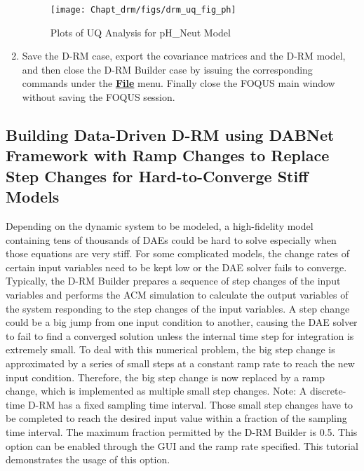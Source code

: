\begin{enumerate}
	\begin{figure}[H]
		\begin{center}
			\texttt{[image: Chapt\_drm/figs/drm\_uq\_fig\_ph]}
			\caption{Plots of UQ Analysis for pH\_Neut Model}
			\label{fig.drm_uq_fig_ph}
		\end{center}
	\end{figure}
	\item Save the D-RM case, export the covariance matrices and the D-RM model, and then close the D-RM Builder case by issuing the corresponding commands under the \textbf{\underline{File}} menu.  Finally close the FOQUS main window without saving the FOQUS session.
\end{enumerate}

\subsection{Building Data-Driven D-RM using DABNet Framework with Ramp Changes to Replace Step Changes for Hard-to-Converge Stiff Models}
Depending on the dynamic system to be modeled, a high-fidelity model containing tens of thousands of DAEs could be hard to solve especially when those equations are very stiff.  For some complicated models, the change rates of certain input variables need to be kept low or the DAE solver fails to converge.  Typically, the D-RM Builder prepares a sequence of step changes of the input variables and performs the ACM simulation to calculate the output variables of the system responding to the step changes of the input variables.  A step change could be a big jump from one input condition to another, causing the DAE solver to fail to find a converged solution unless the internal time step for integration is extremely small.  To deal with this numerical problem, the big step change is approximated by a series of small steps at a constant ramp rate to reach the new input condition.  Therefore, the big step change is now replaced by a ramp change, which is implemented as multiple small step changes.  Note: A discrete-time 
D-RM has a fixed sampling time interval.  Those small step changes have to be completed to reach the desired input value within a fraction of the sampling time interval.  The maximum fraction permitted by the D-RM Builder is 0.5.  This option can be enabled through the GUI and the ramp rate specified.  This tutorial demonstrates the usage of this option.

